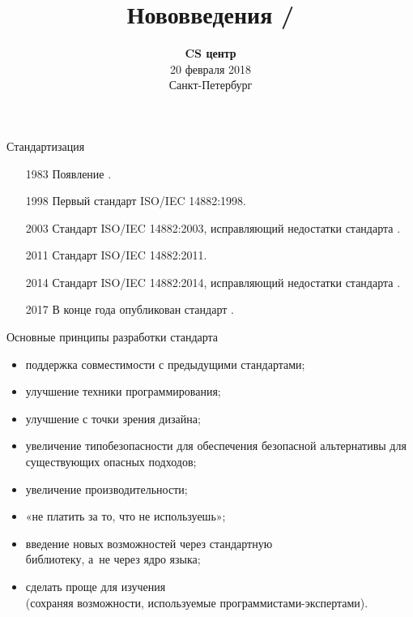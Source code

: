 \documentclass{beamer}
\title{Нововведения \langcpp 11/\langcpp 14}
\date{
   \textbf{CS центр}\\
   20 февраля 2018 \\
   Санкт-Петербург
}
\begin{document}
\begin{frame} 
  \titlepage
\end{frame}


\begin{frame}[fragile]{Стандартизация \langcpp}
    \begin{itemize}
        \pause\item[1983] Появление \langcpp.
        \pause\item[1998] Первый стандарт ISO/IEC 14882:1998.
        \pause\item[2003] Стандарт ISO/IEC 14882:2003, исправляющий недостатки стандарта \langcpp[98].
        \pause\item[2011] Стандарт ISO/IEC 14882:2011.
        \pause\item[2014] Стандарт ISO/IEC 14882:2014, исправляющий недостатки стандарта \langcpp[11].
        \pause\item[2017] В конце года опубликован стандарт \langcpp[17].
\end{itemize}
\end{frame}

\begin{frame}[fragile]{Основные принципы разработки стандарта}
    \begin{itemize}
        \pause\item поддержка совместимости с предыдущими стандартами;
        \pause\item улучшение техники программирования;
        \pause\item улучшение \langcpp с точки зрения дизайна; 
        \pause\item увеличение типобезопасности для обеспечения безопасной альтернативы для существующих опасных подходов;
        \pause\item увеличение производительности;
        \pause\item «не платить за то, что не используешь»;
        \pause\item введение новых возможностей через стандартную\\ библиотеку, а~не через ядро языка;                
        \pause\item сделать \langcpp проще для изучения\\
        (сохраняя возможности, используемые программистами-экспертами).
    \end{itemize}
\end{frame}
\end{document}

